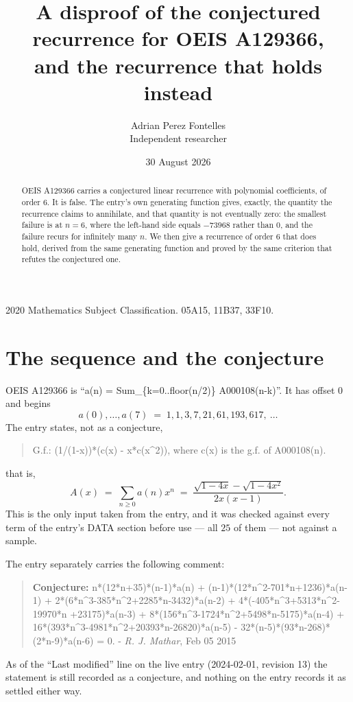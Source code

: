 \documentclass[11pt,a4paper]{article}
\title{A disproof of the conjectured recurrence for OEIS A129366,\\ and the recurrence
that holds instead}
\author{Adrian Perez Fontelles\\ \small Independent researcher}
\date{30 August 2026}
\theoremstyle{plain}
\theoremstyle{definition}
\begin{document}
\maketitle

\begin{abstract}
OEIS A129366 carries a conjectured linear recurrence with polynomial coefficients, of
order 6. It is false. The entry's own generating function gives, exactly, the
quantity the recurrence claims to annihilate, and that quantity is not eventually zero:
the smallest failure is at $n=6$, where the left-hand side equals $-73968$
rather than $0$, and the failure recurs for infinitely many $n$. We then give a recurrence
of order 6 that does hold, derived from the same generating function and proved by
the same criterion that refutes the conjectured one.
\end{abstract}

\noindent\small 2020 Mathematics Subject Classification. 05A15, 11B37, 33F10.\normalsize

\section{The sequence and the conjecture}

OEIS A129366 is ``a(n) = Sum\_\{k=0..floor(n/2)\} A000108(n-k)''. It has offset $0$ and begins
\[
a(0),\dots,a(7)\;=\;1, 1, 3, 7, 21, 61, 193, 617,\ \dots
\]
The entry states, not as a conjecture,
\begin{quote}\small
G.f.: (1/(1-x))*(c(x) - x*c(x\^{}2)), where c(x) is the g.f. of A000108(n).
\end{quote}
that is,
\begin{equation}\label{eq:gf}
A(x)\;=\;\sum_{n\ge 0}a(n)x^{n}\;=\;\frac{\sqrt{1 - 4 x} - \sqrt{1 - 4 x^{2}}}{2 x \left(x - 1\right)} .
\end{equation}
This is the only input taken from the entry, and it was checked against every term of the
entry's DATA section before use --- all $25$ of them --- not against a sample.

The entry separately carries the following comment:
\begin{quote}\small
\textbf{Conjecture:} n*(12*n+35)*(n-1)*a(n) + (n-1)*(12*n\^{}2-701*n+1236)*a(n-1) + 2*(6*n\^{}3-385*n\^{}2+2285*n-3432)*a(n-2) + 4*(-405*n\^{}3+5313*n\^{}2-19970*n +23175)*a(n-3) + 8*(156*n\^{}3-1724*n\^{}2+5498*n-5175)*a(n-4) + 16*(393*n\^{}3-4981*n\^{}2+20393*n-26820)*a(n-5) - 32*(n-5)*(93*n-268)*(2*n-9)*a(n-6) = 0. - \emph{R. J. Mathar}, Feb 05 2015
\end{quote}
As of the ``Last modified'' line on the live entry (2024-02-01, revision 13) the
statement is still recorded as a conjecture, and nothing on the entry records it as
settled either way.
\end{document}
